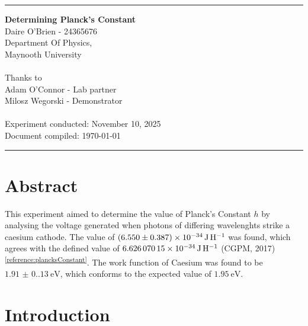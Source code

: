 \documentclass{article}[12pt]
\newcommand{\reference}[3]{(#2, #3)\textsuperscript{\ref{#1}}} %
\begin{document}
    \vspace*{\fill}
    \hrule
    \vspace*{10pt}
    \begin{center}
            \huge\textbf{Determining Planck's Constant} \\
            \Large Daire O'Brien - 24365676 \\
            \large Department Of Physics, \\
            Maynooth University \\ ~ \\
            Thanks to \\
            Adam O'Connor - Lab partner\\
            Milosz Wegorski - Demonstrator\\~\\
            \normalsize 
            Experiment conducted: November 10, 2025 \\
            Document compiled: \today \\
    \end{center}
    \vspace*{10pt}
    \hrule
    \vspace*{\fill}
    \setcounter{page}{0}
    \newpage

    \setcounter{page}{1}
    \tableofcontents

    \section*{Abstract}
        This experiment aimed to determine the value of Planck's Constant $h$ by analysing the voltage generated when photons of differing wavelenghts strike a caesium cathode. The value of $\qty{6.55(0.387)E-34}{\J\per\H}$ was found, which agrees with the defined value of $\qty{6.62607015E-34}{\J\per\H}$ \reference{reference:plancksConstant}{CGPM}{2017}. The work function of Caesium was found to be $\qty{1.91(0.13)}{\eV}$, which conforms to the expected value of $\qty{1.95}{\eV}$.

    \section{Introduction}
\end{document}

